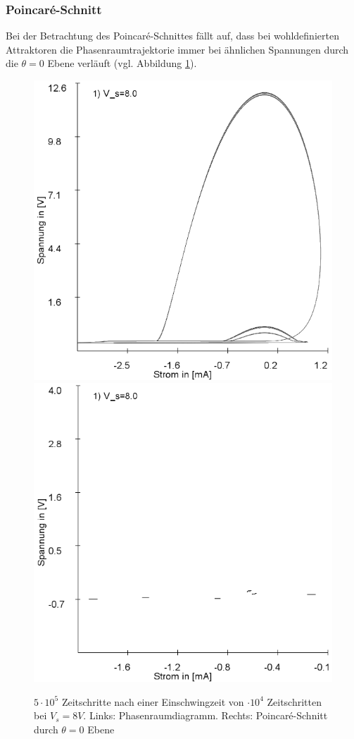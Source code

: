\documentclass{scrartcl}
\begin{document}
\subsubsection{Poincaré-Schnitt}
Bei der Betrachtung des Poincaré-Schnittes fällt auf, dass bei wohldefinierten Attraktoren die Phasenraumtrajektorie immer bei ähnlichen Spannungen durch die $\theta=0$ Ebene verläuft (vgl. Abbildung \ref{fig:ldr-poin1}).
\begin{figure}
\includegraphics[scale=0.4]{schwing-500k-nach-10k-8V-phase}
\includegraphics[scale=0.4]{schwing-500k-nach-10k-8V-poin}
\caption{$5\cdot10^5$ Zeitschritte nach einer Einschwingzeit von $\cdot10^4$ Zeitschritten bei $V_s=8V$. Links: Phasenraumdiagramm. Rechts: Poincaré-Schnitt durch $\theta=0$ Ebene}
\label{fig:ldr-poin1}
\end{figure}
\end{document}
